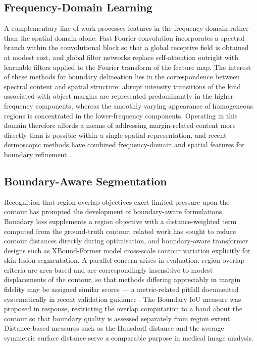 \subsection{Frequency-Domain Learning}

A complementary line of work processes features in the frequency domain rather than the spatial domain alone. Fast Fourier convolution \cite{ref13} incorporates a spectral branch within the convolutional block so that a global receptive field is obtained at modest cost, and global filter networks \cite{ref14} replace self-attention outright with learnable filters applied to the Fourier transform of the feature map. The interest of these methods for boundary delineation lies in the correspondence between spectral content and spatial structure: abrupt intensity transitions of the kind associated with object margins are represented predominantly in the higher-frequency components, whereas the smoothly varying appearance of homogeneous regions is concentrated in the lower-frequency components. Operating in this domain therefore affords a means of addressing margin-related content more directly than is possible within a single spatial representation, and recent dermoscopic methods have combined frequency-domain and spatial features for boundary refinement \cite{ref27}.

\subsection{Boundary-Aware Segmentation}

Recognition that region-overlap objectives exert limited pressure upon the contour has prompted the development of boundary-aware formulations. Boundary loss \cite{ref19} supplements a region objective with a distance-weighted term computed from the ground-truth contour, related work has sought to reduce contour distances directly during optimisation, and boundary-aware transformer designs such as XBound-Former \cite{ref28} model cross-scale contour variation explicitly for skin-lesion segmentation. A parallel concern arises in evaluation: region-overlap criteria are area-based and are correspondingly insensitive to modest displacements of the contour, so that methods differing appreciably in margin fidelity may be assigned similar scores --- a metric-related pitfall documented systematically in recent validation guidance \cite{ref29}. The Boundary IoU measure \cite{ref12} was proposed in response, restricting the overlap computation to a band about the contour so that boundary quality is assessed separately from region extent. Distance-based measures such as the Hausdorff distance and the average symmetric surface distance serve a comparable purpose in medical image analysis.

